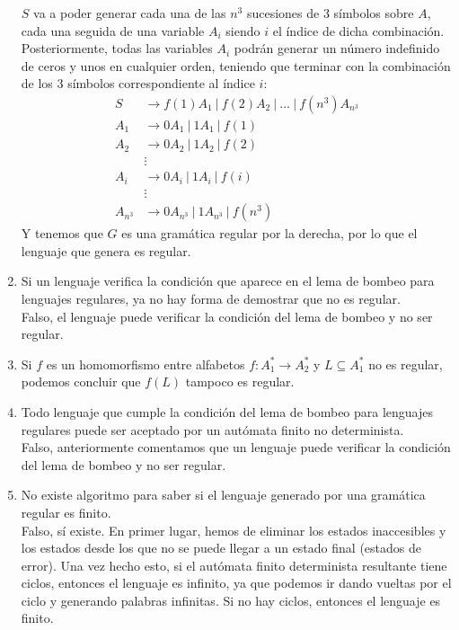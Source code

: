 \begin{enumerate}
        $S$ va a poder generar cada una de las $n^3$ sucesiones de 3 símbolos sobre $A$, cada una seguida de una variable $A_i$ siendo $i$ el índice de dicha combinación. Posteriormente, todas las variables $A_i$ podrán generar un número indefinido de ceros y unos en cualquier orden, teniendo que terminar con la combinación de los 3 símbolos correspondiente al índice $i$:
        \begin{align*}
            S &\rightarrow f(1)A_1\ |\ f(2)A_2\ |\ \ldots\ |\ f(n^3)A_{n^3} \\
            A_1 &\rightarrow 0A_1\ |\ 1A_1\ |\ f(1) \\
            A_2 &\rightarrow 0A_2\ |\ 1A_2\ |\ f(2) \\
                &\vdots \\
            A_i &\rightarrow 0A_i\ |\ 1A_i\ |\ f(i) \\
                &\vdots \\
            A_{n^3} &\rightarrow 0A_{n^3}\ |\ 1A_{n^3}\ |\ f(n^3)
        \end{align*}
        Y tenemos que $G$ es una gramática regular por la derecha, por lo que el lenguaje que genera es regular.
    \item Si un lenguaje verifica la condición que aparece en el lema de bombeo para lenguajes regulares, ya no hay forma de demostrar que no es regular.\\

        Falso, el lenguaje puede verificar la condición del lema de bombeo y no ser regular.
    \item Si $f$ es un homomorfismo entre alfabetos $f:A_1^\ast\rightarrow A_2^\ast$ y $L\subseteq A_1^\ast$ no es regular, podemos concluir que $f(L)$ tampoco es regular.\\

    \item Todo lenguaje que cumple la condición del lema de bombeo para lenguajes regulares puede ser aceptado por un autómata finito no determinista.\\

        Falso, anteriormente comentamos que un lenguaje puede verificar la condición del lema de bombeo y no ser regular.
    \item No existe algoritmo para saber si el lenguaje generado por una gramática regular es finito.\\
    
        Falso, sí existe. En primer lugar, hemos de eliminar los estados inaccesibles y los estados desde los que no se puede llegar a un estado final (estados de error). Una vez hecho esto, si el autómata finito determinista resultante tiene ciclos, entonces el lenguaje es infinito, ya que podemos ir dando vueltas por el ciclo y generando palabras infinitas. Si no hay ciclos, entonces el lenguaje es finito.


\end{enumerate}
